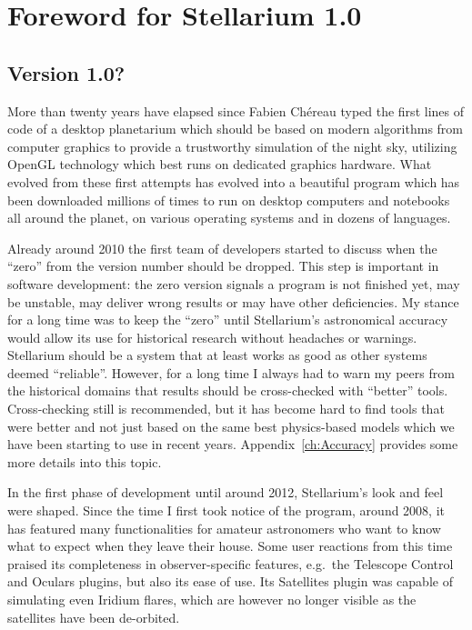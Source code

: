 
\chapter*{Foreword for Stellarium 1.0}
\label{ch:Foreword}

\section*{Version 1.0?}

More than twenty years have elapsed since Fabien Ch\'ereau typed the
first lines of code of a desktop planetarium which should be based on
modern algorithms from computer graphics to provide a trustworthy
simulation of the night sky, utilizing OpenGL technology which best
runs on dedicated graphics hardware. What evolved from these first
attempts has evolved into a beautiful program which has been
downloaded millions of times to run on desktop computers and notebooks
all around the planet, on various operating systems and in dozens of
languages.

Already around 2010 the first team of developers started to discuss
when the ``zero'' from the version number should be dropped. This step
is important in software development: the zero version signals a
program is not finished yet, may be unstable, may deliver wrong
results or may have other deficiencies. My stance for a long time was
to keep the ``zero'' until Stellarium's astronomical accuracy would
allow its use for historical research without headaches or
warnings. Stellarium should be a system that at least works as good as
other systems deemed ``reliable''. However, for a long time I always
had to warn my peers from the historical domains that results should
be cross-checked with ``better'' tools. Cross-checking still is
recommended, but it has become hard to find tools that were better and
not just based on the same best physics-based models which we have
been starting to use in recent years. Appendix~\ref{ch:Accuracy}
provides some more details into this topic.

In the first phase of development until around 2012, Stellarium's look
and feel were shaped. Since the time I first took notice of the
program, around 2008, it has featured many functionalities for amateur
astronomers who want to know what to expect when they leave their
house. Some user reactions from this time praised its completeness in
observer-specific features, e.g.\ the Telescope Control and Oculars
plugins, but also its ease of use. Its Satellites plugin was capable of
simulating even Iridium flares, which are however no longer visible as
the satellites have been de-orbited.

